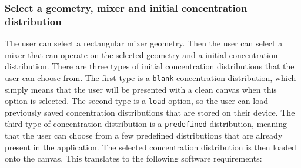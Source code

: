 \subsubsection{Select a geometry, mixer and initial concentration distribution}
The user can select a rectangular mixer geometry. Then the user can select a mixer that can operate on the selected geometry and a initial concentration distribution. There are three types of initial concentration distributions that the user can choose from. The first type is a \texttt{blank} concentration distribution, which simply means that the user will be presented with a clean canvas when this option is selected. The second type is a \texttt{load} option, so the user can load previously saved concentration distributions that are stored on their device. The third type of 
concentration distribution is a \texttt{predefined} distribution, meaning that the user can choose from a few predefined distributions that are already present in the application. The selected concentration distribution is then loaded onto the canvas. This translates to the following software requirements:

